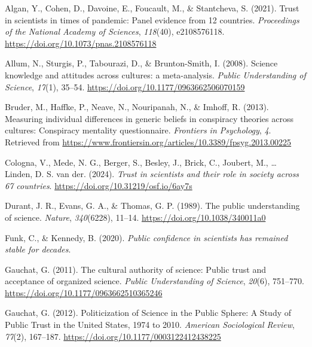 \documentclass[
  doc,floatsintext]{apa6}
\newlength{\cslhangindent}
\newenvironment{CSLReferences}[2] %
 {\begin{list}{}{%
  \setlength{\itemindent}{0pt}
  \setlength{\leftmargin}{0pt}
  \setlength{\parsep}{0pt}
  \ifodd #1
   \setlength{\leftmargin}{\cslhangindent}
   \setlength{\itemindent}{-1\cslhangindent}
  \fi
  \setlength{\itemsep}{#2\baselineskip}}}
 {\end{list}}
\begin{document}
\label{refs}
\begin{CSLReferences}{1}{0}
Algan, Y., Cohen, D., Davoine, E., Foucault, M., \& Stantcheva, S. (2021). Trust in scientists in times of pandemic: Panel evidence from 12 countries. \emph{Proceedings of the National Academy of Sciences}, \emph{118}(40), e2108576118. \url{https://doi.org/10.1073/pnas.2108576118}

Allum, N., Sturgis, P., Tabourazi, D., \& Brunton-Smith, I. (2008). Science knowledge and attitudes across cultures: a meta-analysis. \emph{Public Understanding of Science}, \emph{17}(1), 35--54. \url{https://doi.org/10.1177/0963662506070159}

Bruder, M., Haffke, P., Neave, N., Nouripanah, N., \& Imhoff, R. (2013). Measuring individual differences in generic beliefs in conspiracy theories across cultures: Conspiracy mentality questionnaire. \emph{Frontiers in Psychology}, \emph{4}. Retrieved from \url{https://www.frontiersin.org/articles/10.3389/fpsyg.2013.00225}

Cologna, V., Mede, N. G., Berger, S., Besley, J., Brick, C., Joubert, M., \ldots{} Linden, D. S. van der. (2024). \emph{Trust in scientists and their role in society across 67 countries}. \url{https://doi.org/10.31219/osf.io/6ay7s}

Durant, J. R., Evans, G. A., \& Thomas, G. P. (1989). The public understanding of science. \emph{Nature}, \emph{340}(6228), 11--14. \url{https://doi.org/10.1038/340011a0}

Funk, C., \& Kennedy, B. (2020). \emph{Public confidence in scientists has remained stable for decades}.

Gauchat, G. (2011). The cultural authority of science: Public trust and acceptance of organized science. \emph{Public Understanding of Science}, \emph{20}(6), 751--770. \url{https://doi.org/10.1177/0963662510365246}

Gauchat, G. (2012). Politicization of Science in the Public Sphere: A Study of Public Trust in the United States, 1974 to 2010. \emph{American Sociological Review}, \emph{77}(2), 167--187. \url{https://doi.org/10.1177/0003122412438225}


\end{CSLReferences}
\end{document}
